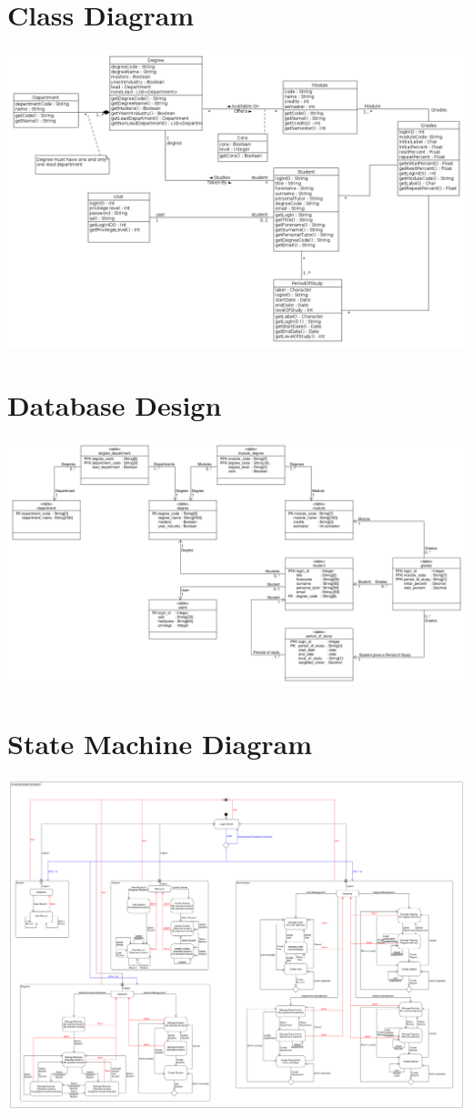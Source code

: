 \documentclass[12pt,a4paper]{article}
\begin{document}
\section{Class Diagram}

\centerline{\includegraphics[width=20cm]{classDiagram3}}


\section{Database Design}

\centerline{\includegraphics[width=20cm]{databaseClassDiagram}}

\section{State Machine Diagram}
\centerline{\includegraphics[width=20cm]{stateDiagram}}
\end{document}

